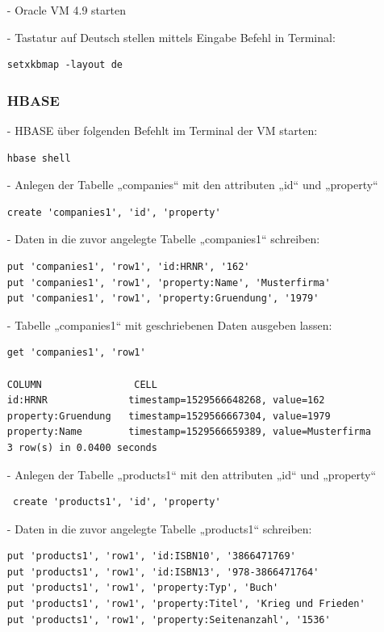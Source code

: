 \begin{itemize}
\item[-] Oracle VM 4.9 starten

\item[-] Tastatur auf Deutsch stellen mittels Eingabe Befehl in Terminal:
\begin{lstlisting}
setxkbmap -layout de
\end{lstlisting}

\subsubsection*{HBASE}
\item[-] HBASE über folgenden Befehlt im Terminal der VM starten:
\begin{lstlisting}
hbase shell
\end{lstlisting}

\item[-] Anlegen der Tabelle „companies“ mit den attributen „id“ und „property“
\begin{lstlisting}
create 'companies1', 'id', 'property'
\end{lstlisting}

\item[-] Daten in die zuvor angelegte Tabelle „companies1“ schreiben:
\begin{lstlisting}
put 'companies1', 'row1', 'id:HRNR', '162'
put 'companies1', 'row1', 'property:Name', 'Musterfirma'
put 'companies1', 'row1', 'property:Gruendung', '1979'
\end{lstlisting}

\item[-] Tabelle „companies1“ mit geschriebenen Daten ausgeben lassen:
\begin{lstlisting}
get 'companies1', 'row1'

COLUMN                CELL
id:HRNR              timestamp=1529566648268, value=162
property:Gruendung   timestamp=1529566667304, value=1979
property:Name        timestamp=1529566659389, value=Musterfirma
3 row(s) in 0.0400 seconds
\end{lstlisting}

\item[-] Anlegen der Tabelle „products1“ mit den attributen „id“ und „property“
\begin{lstlisting}
 create 'products1', 'id', 'property'
\end{lstlisting}

\item[-] Daten in die zuvor angelegte Tabelle „products1“ schreiben:
\begin{lstlisting}
put 'products1', 'row1', 'id:ISBN10', '3866471769'
put 'products1', 'row1', 'id:ISBN13', '978-3866471764'
put 'products1', 'row1', 'property:Typ', 'Buch'
put 'products1', 'row1', 'property:Titel', 'Krieg und Frieden'
put 'products1', 'row1', 'property:Seitenanzahl', '1536'
\end{lstlisting}


\end{itemize}
